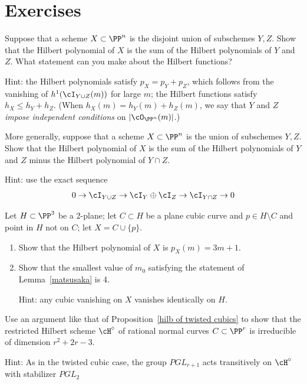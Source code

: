 \section{Exercises}


\begin{exercise}\label{deg of disjoint union}
Suppose that a scheme $X\subset \PP^n$ is the disjoint union of subschemes $Y,Z$. Show that the Hilbert polynomial of
$X$ is the sum of the Hilbert polynomials of $Y$ and $Z$. What statement can you make about the Hilbert functions?

Hint: the Hilbert polynomials satisfy $p_X = p_Y + p_Z$, which follows from the vanishing of $h^1(\cI_{Y\cup Z} (m))$ for large $m$; the Hilbert functions satisfy $h_X \leq h_Y + h_Z$. (When $h_X(m) = h_Y(m) + h_Z(m)$, we say that $Y$ and $Z$ \emph{impose independent conditions} on $|\cO_{\PP^n}(m)|$.)
\end{exercise}

\begin{exercise}
More generally, suppose that a scheme $X\subset \PP^n$ is the union of subschemes $Y,Z$. Show that the Hilbert polynomial of
$X$ is the sum of the Hilbert polynomials of $Y$ and $Z$ minus the Hilbert polynomial of $Y\cap Z$. 

Hint: use the exact sequence
$$
0 \to \cI_{Y\cup Z} \to \cI_{Y} \oplus \cI_{Z} \to \cI_{Y \cap Z} \to 0
$$
\end{exercise}

\begin{exercise}
Let $H \subset \PP^3$ be a 2-plane; let $C \subset H$ be a plane cubic curve and $p \in H \setminus C$ and point in $H$ not on $C$; let $X = C \cup \{p\}$.
\begin{enumerate}
\item Show that the Hilbert polynomial of $X$ is $p_X(m) = 3m+1$.
\item Show that the smallest value of $m_0$ satisfying the statement of Lemma~\ref{matsusaka} is 4.

Hint: any cubic vanishing on $X$ vanishes identically on $H$.
\end{enumerate}
\end{exercise}

\begin{exercise}\label{rational normal hilbert}
Use an  argument like that of Proposition~\ref{hilb of twisted cubics} to show that the restricted Hilbert scheme $\cH^\circ$ of rational normal curves $C \subset \PP^r$ is irreducible of dimension $r^2+2r-3$.

Hint: As in the twisted cubic case, the group $PGL_{r+1}$ acts transitively on $\cH^\circ$ with stabilizer $PGL_2$
\end{exercise}

